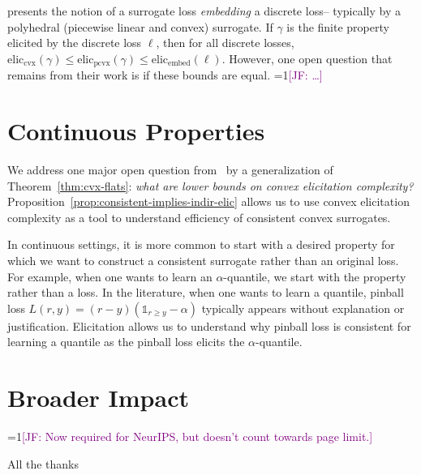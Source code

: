 \documentclass{article}
\newcommand{\Comments}{1}
\newcommand{\mynote}[2]{\ifnum\Comments=1\textcolor{#1}{#2}\fi}
\newcommand{\jessie}[1]{\mynote{purple}{[JF: #1]}}
\newcommand{\eliccvx}{\mathrm{elic}_\mathrm{cvx}}
\newcommand{\elicpoly}{\mathrm{elic}_\mathrm{pcvx}}
\newcommand{\elicembed}{\mathrm{elic}_\mathrm{embed}}
\begin{document}
\cite{finocchiaro2019embedding} presents the notion of a surrogate loss \emph{embedding} a discrete loss-- typically by a polyhedral (piecewise linear and convex) surrogate.
If $\gamma$ is the finite property elicited by the discrete loss $\ell$, then for all discrete losses, $\eliccvx(\gamma) \leq \elicpoly(\gamma) \leq \elicembed(\ell)$.
However, one open question that remains from their work is if these bounds are equal. \jessie{\ldots} 



\section{Continuous Properties}\label{sec:contin-consis}
We address one major open question from~\cite{frongillo2015elicitation} by a generalization of Theorem~\ref{thm:cvx-flats}: \emph{what are lower bounds on convex elicitation complexity?}
Proposition~\ref{prop:consistent-implies-indir-elic} allows us to use convex elicitation complexity as a tool to understand efficiency of consistent convex surrogates.

In continuous settings, it is more common to start with a desired property for which we want to construct a consistent surrogate rather than an original loss.
For example, when one wants to learn an $\alpha$-quantile, we start with the property rather than a loss.
In the literature, when one wants to learn a quantile, pinball loss $L(r,y) = (r-y)(\mathbb{1}_{r \geq y} - \alpha)$ typically appears without explanation or justification.
Elicitation allows us to understand why pinball loss is consistent for learning a quantile as the pinball loss elicits the $\alpha$-quantile.



\newpage

\section*{Broader Impact}
\jessie{Now required for NeurIPS, but doesn't count towards page limit.}

\begin{ack}
All the thanks
\end{ack}



\end{document}
